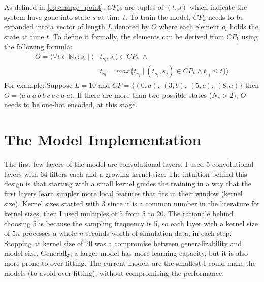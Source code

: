 As defined in \eqref{eq:change_point}, $CP_k$s are tuples of $(t, s)$ which indicate the system have gone into state $s$ at time $t$. To train the model, $CP_k$ needs to be expanded into a vector of length $L$ denoted by $O$ where each element $o_t$ holds the state at time $t$. To define it formally, the elements can be derived from $CP_k$ using the following formula:
\begin{equation} \label{eq:output}
\begin{split}
O = \langle  \forall t \in \mathbb{N}_L : s_i \:|\:
           (& t_{s_i}, s_i) \in CP_k \: \land  \\
            & t_{s_i} = max\{t_{s_j} \:|\: (t_{s_j}, s_j) \in CP_k \land t_{s_j}\leq t\} \rangle
\end{split}
\end{equation}
For example: Suppose $L=10$ and $CP = \{(0, a),\:(3, b),\:(5, c),\:(8, a)\}$ 
then $O = \langle a\:a\:a\:b\:b\:c\:c\:c\:a\:a \rangle$.
If there are more than two possible states ($N_s > 2$), $O$ needs to be one-hot encoded, at this stage.



\section{The Model Implementation} \label{sec:architecture_detail}
The first few layers of the model are convolutional layers. I used 5 convolutional layers with 64 filters each and a growing kernel size.
The intuition behind this design is that starting with a small kernel guides the training in a way that the first layers learn simpler more local features that fits in their window (kernel size).
Kernel sizes started with 3 since it is a common number in the literature for kernel sizes, then I used multiples of 5 from 5 to 20. 
The rationale behind choosing 5 is because the sampling frequency is 5, so each layer with a kernel size of $5n$ processes a whole $n$ seconds worth of simulation data, in each step.
Stopping at kernel size of 20 was a compromise between generalizability and model size. Generally, a larger model has more learning capacity, but it is also more prone to over-fitting. The current models are the smallest I could make the models (to avoid over-fitting), without compromising the performance.


